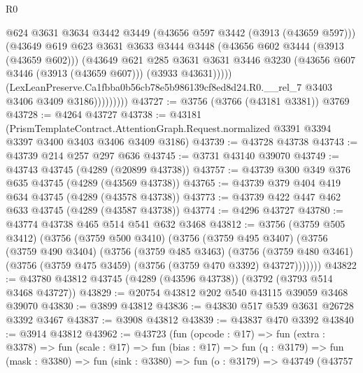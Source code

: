 \begin{lexlean}{R0}
\begin{coremodule}
                        @624
                        @3631
                        @3634
                        @3442
                        @3449
                        (@43656 @597 @3442 (@3913 (@43659 @597)))
                        (@43649
                          @619
                          @623
                          @3631
                          @3633
                          @3444
                          @3448
                          (@43656 @602 @3444 (@3913 (@43659 @602)))
                          (@43649
                            @621
                            @285
                            @3631
                            @3631
                            @3446
                            @3230
                            (@43656 @607 @3446 (@3913 (@43659 @607)))
                            (@3933 @43631)))))
                    (LexLeanPreserve.Ca1fbba0b56cb78e5b986139cf8ed8d24.R0.__rel_7
                      @3403
                      @3406
                      @3409
                      @3186)))))))))
@43727 := @3756 (@3766 (@43181 @3381)) @3769
@43728 := @4264 @43727
@43738 := @43181
    (PrismTemplateContract.AttentionGraph.Request.normalized
      @3391
      @3394
      @3397
      @3400
      @3403
      @3406
      @3409
      @3186)
@43739 := @43728 @43738
@43743 := @43739 @214 @257 @297 @636
@43745 := @3731 @43140 @39070
@43749 := @43743 @43745 (@4289 (@20899 @43738))
@43757 := @43739 @300 @349 @376 @635 @43745 (@4289 (@43569 @43738))
@43765 := @43739 @379 @404 @419 @634 @43745 (@4289 (@43578 @43738))
@43773 := @43739 @422 @447 @462 @633 @43745 (@4289 (@43587 @43738))
@43774 := @4296 @43727
@43780 := @43774 @43738 @465 @514 @541 @632 @3468
@43812 := @3756
    (@3759 @505 @3412)
    (@3756
      (@3759 @500 @3410)
      (@3756
        (@3759 @495 @3407)
        (@3756
          (@3759 @490 @3404)
          (@3756
            (@3759 @485 @3463)
            (@3756
              (@3759 @480 @3461)
              (@3756 (@3759 @475 @3459) (@3756 (@3759 @470 @3392) @43727)))))))
@43822 := @43780 @43812 @43745 (@4289 (@43596 @43738)) (@3792 (@3793 @514 @3468 @43727))
@43829 := @20754 @43812 @202 @540 @43115 @39059 @3468 @39070
@43830 := @3899 @43812
@43836 := @43830 @517 @539 @3631 @26728 @3392 @3467
@43837 := @3908 @43812
@43839 := @43837 @470 @3392
@43840 := @3914 @43812
@43962 := @43723
    (fun (opcode : @17) =>
    fun (extra : @3378) =>
    fun (scale : @17) =>
    fun (bias : @17) =>
    fun (q : @3179) =>
    fun (mask : @3380) =>
    fun (sink : @3380) =>
    fun (o : @3179) =>
    @43749
      (@43757

\end{coremodule}
\end{lexlean}
